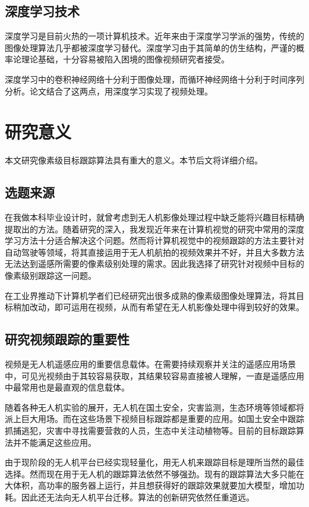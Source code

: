 \subsection{深度学习技术}
深度学习是目前火热的一项计算机技术。近年来由于深度学习学派的强势，传统的图像处理算法几乎都被深度学习替代。深度学习由于其简单的仿生结构，严谨的概率论理论基础，十分容易被陷入困境的图像视频研究者接受。
\par
深度学习中的卷积神经网络十分利于图像处理，而循环神经网络十分利于时间序列分析。论文结合了这两点，用深度学习实现了视频处理。

\newpage
\section{研究意义}
本文研究像素级目标跟踪算法具有重大的意义。本节后文将详细介绍。
\subsection{选题来源}
在我做本科毕业设计\supercite{benchme}时，就曾考虑到无人机影像处理过程中缺乏能将兴趣目标精确提取出的方法。随着研究的深入，我发现近年来在计算机视觉的研究中常用的深度学习方法十分适合解决这个问题。然而将计算机视觉中的视频跟踪的方法主要针对自动驾驶等领域，将其直接运用于无人机航拍的视频效果并不好，并且大多数方法无法达到遥感所需要的像素级别处理的需求。因此我选择了研究针对视频中目标的像素级别跟踪这一问题。
\par
在工业界推动下计算机学者们已经研究出很多成熟的像素级图像处理算法，将其目标稍加改动，即可运用在视频，从而有希望在无人机影像处理中得到较好的效果。

\subsection{研究视频跟踪的重要性}
视频是无人机遥感应用的重要信息载体。在需要持续观察并关注的遥感应用场景中，可见光视频由于其较容易获取，其结果较容易直接被人理解，一直是遥感应用中最常用也是最直观的信息载体。
\par
随着各种无人机实验的展开，无人机在国土安全，灾害监测，生态环境等领域都将派上巨大用场。而在这些场景下视频目标跟踪都是重要的应用。如国土安全中跟踪抓捕逃犯，灾害中寻找需要营救的人员，生态中关注动植物等。目前的目标跟踪算法并不能满足这些应用。
\par
由于现阶段的无人机平台已经实现轻量化，用无人机来跟踪目标是理所当然的最佳选择。然而现在用于无人机的跟踪算法依然不够强劲。现有的跟踪算法大多只能在大体积，高功率的服务器上运行，并且想获得好的跟踪效果就要加大模型，增加功耗。因此还无法向无人机平台迁移。算法的创新研究依然任重道远。

